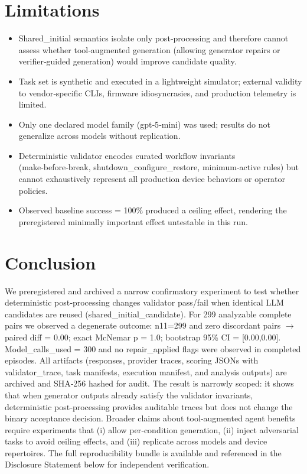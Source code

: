 \documentclass[conference]{IEEEtran}
\begin{document}
\section{Limitations}
\begin{itemize}
\item Shared\_initial semantics isolate only post‑processing and therefore cannot assess whether tool‑augmented generation (allowing generator repairs or verifier‑guided generation) would improve candidate quality.
\item Task set is synthetic and executed in a lightweight simulator; external validity to vendor‑specific CLIs, firmware idiosyncrasies, and production telemetry is limited.
\item Only one declared model family (gpt‑5‑mini) was used; results do not generalize across models without replication.
\item Deterministic validator encodes curated workflow invariants (make‑before‑break, shutdown\_configure\_restore, minimum‑active rules) but cannot exhaustively represent all production device behaviors or operator policies.
\item Observed baseline success = 100\% produced a ceiling effect, rendering the preregistered minimally important effect untestable in this run.
\end{itemize}

\section{Conclusion}
We preregistered and archived a narrow confirmatory experiment to test whether deterministic post‑processing changes validator pass/fail when identical LLM candidates are reused (shared\_initial\_candidate). For 299 analyzable complete pairs we observed a degenerate outcome: n11=299 and zero discordant pairs \ensuremath{\rightarrow} paired diff = 0.00; exact McNemar p = 1.0; bootstrap 95\% CI = [0.00,0.00]. Model\_calls\_used = 300 and no repair\_applied flags were observed in completed episodes. All artifacts (responses, provider traces, scoring JSONs with validator\_trace, task manifests, execution manifest, and analysis outputs) are archived and SHA‑256 hashed for audit. The result is narrowly scoped: it shows that when generator outputs already satisfy the validator invariants, deterministic post‑processing provides auditable traces but does not change the binary acceptance decision. Broader claims about tool‑augmented agent benefits require experiments that (i) allow per‑condition generation, (ii) inject adversarial tasks to avoid ceiling effects, and (iii) replicate across models and device repertoires. The full reproducibility bundle is available and referenced in the Disclosure Statement below for independent verification.
\end{document}

